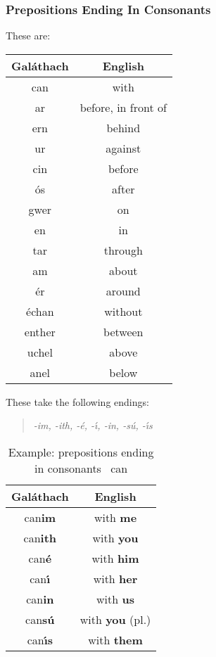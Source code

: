 \subsubsection{Prepositions Ending In Consonants}
These are:
\begin{table}[H]
\centering
\begin{tabu}{c|c}
  \textbf{Gal\'{a}thach} & \textbf{English}\\
  \toprule
  can & with\\
  ar & before, in front of\\
  ern & behind\\
  ur & against\\
  cin & before\\
  \'{o}s & after\\
  gwer & on\\
  en & in\\
  tar & through\\
  am & about\\
  \'{e}r & around\\
  \'{e}chan & without\\
  enther & between\\
  uchel & above\\
  anel & below
\end{tabu}
\label{summary_prepositions_ending_in_consonants}
\end{table}

These take the following endings:
\begin{quote}
\textit{-im, -ith, -\'{e}, -\'{\i}, -in, -s\'{u}, -\'{\i}s}
\end{quote}

\begin{table}[H]
\centering
\begin{tabu}{c|c}
  \textbf{Gal\'{a}thach} & \textbf{English}\\
  \toprule
  can\textbf{im} & with \textbf{me}\\
  can\textbf{ith} & with \textbf{you}\\
  can\textbf{\'{e}} & with \textbf{him}\\
  can\textbf{\'{\i}} & with \textbf{her}\\
  can\textbf{in} & with \textbf{us}\\
  can\textbf{s\'{u}} & with \textbf{you} (pl.)\\
  can\textbf{\'{\i}s} & with \textbf{them}
\end{tabu}
\caption{Example: prepositions ending in consonants \textendash\ can}
\label{example_prepositions_ending_in_consonants_can}
\end{table}

